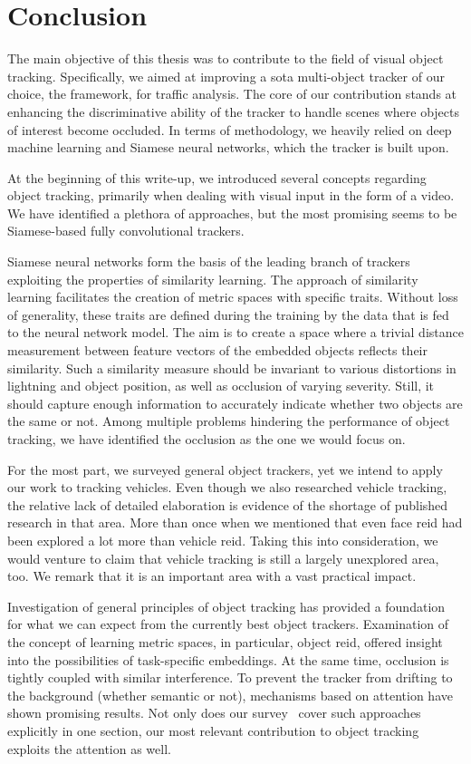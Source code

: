 \section{Conclusion}
\label{sec:Conclusion}

The main objective of this thesis was to contribute to the field of visual object tracking. Specifically, we aimed at improving a \gls{sota} multi-object tracker of our choice, the \siammot{} framework, for traffic analysis. The core of our contribution stands at enhancing the discriminative ability of the tracker to handle scenes where objects of interest become occluded. In terms of methodology, we heavily relied on deep machine learning and Siamese neural networks, which the \siammot{} tracker is built upon.

At the beginning of this write-up, we introduced several concepts regarding object tracking, primarily when dealing with visual input in the form of a video. We have identified a plethora of approaches, but the most promising seems to be Siamese-based fully convolutional trackers.

Siamese neural networks form the basis of the leading branch of trackers exploiting the properties of similarity learning. The approach of similarity learning facilitates the creation of metric spaces with specific traits. Without loss of generality, these traits are defined during the training by the data that is fed to the neural network model. The aim is to create a space where a trivial distance measurement between feature vectors of the embedded objects reflects their similarity. Such a similarity measure should be invariant to various distortions in lightning and object position, as well as occlusion of varying severity. Still, it should capture enough information to accurately indicate whether two objects are the same or not. Among multiple problems hindering the performance of object tracking, we have identified the occlusion as the one we would focus on.

For the most part, we surveyed general object trackers, yet we intend to apply our work to tracking vehicles. Even though we also researched vehicle tracking, the relative lack of detailed elaboration is evidence of the shortage of published research in that area. More than once when we mentioned that even face \gls{reid} had been explored a lot more than vehicle \gls{reid}. Taking this into consideration, we would venture to claim that vehicle tracking is still a largely unexplored area, too. We remark that it is an important area with a vast practical impact.

Investigation of general principles of object tracking has provided a foundation for what we can expect from the currently best object trackers. Examination of the concept of learning metric spaces, in particular, object \gls{reid}, offered insight into the possibilities of task-specific embeddings. At the same time, occlusion is tightly coupled with similar interference. To prevent the tracker from drifting to the background (whether semantic or not), mechanisms based on attention have shown promising results. Not only does our survey~\cite{ondrasovic2021siamese} cover such approaches explicitly in one section, our most relevant contribution to object tracking exploits the attention as well.
